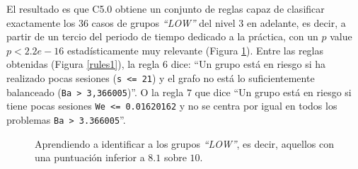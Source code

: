 El resultado es que C5.0 obtiene un conjunto de reglas capaz de clasificar exactamente los $36$ casos de grupos \emph{``LOW''} del nivel $3$ en adelante, es decir, a partir de un tercio del periodo de tiempo dedicado a la práctica, con un $p$ value $p < 2.2e-16$ estadísticamente muy relevante (Figura \ref{fig:cm1}). Entre las reglas obtenidas (Figura \ref{rules1}), la regla $6$ dice: ``Un grupo está en riesgo si ha realizado pocas sesiones (\texttt{s <= 21}) y el grafo no está lo suficientemente balanceado (\texttt{Ba > 3,366005})''. O la regla $7$ que dice ``Un grupo está en riesgo si tiene pocas sesiones \texttt{We <= 0.01620162} y no se centra por igual en todos los problemas \texttt{Ba > 3.366005}''. %

\begin{figure}[H]
\centering
{}
\caption{Aprendiendo a identificar a los grupos \emph{``LOW''}, es decir, aquellos con una puntuación inferior a $8.1$ sobre $10$.}
\label{fig:cm1}
\end{figure}

